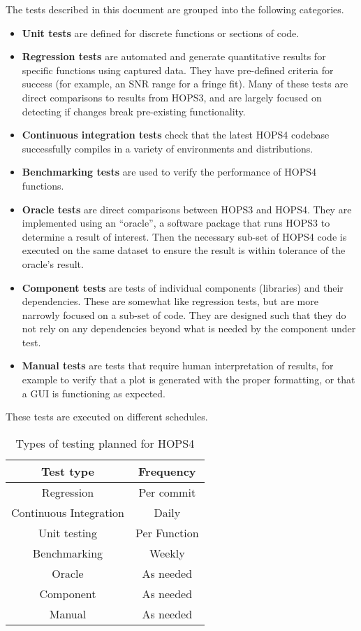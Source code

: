 \documentclass[notitlepage,letterpaper,pdftex,12pt,final]{article}
\numberwithin{equation}{section}
\begin{document}
The tests described in this document are grouped into the following categories.

\begin{itemize}
\item[] \textbf{Unit tests} are defined for discrete functions or sections of code.
\item[] \textbf{Regression tests} are automated and generate quantitative results for specific
  functions using captured data. They have pre-defined criteria for success (for example, an SNR range for a fringe fit). Many of these tests are direct comparisons to results from HOPS3,
  and are largely focused on detecting if changes break pre-existing functionality.
\item[] \textbf{Continuous integration tests} check that the latest HOPS4 codebase successfully compiles in a variety of environments and distributions.
\item[] \textbf{Benchmarking tests} are used to verify the performance of HOPS4 functions.
\item[] \textbf{Oracle tests} are direct comparisons between HOPS3 and HOPS4. They are implemented using an ``oracle'', a software package that runs HOPS3 to determine a result of interest. Then the necessary sub-set of HOPS4 code is executed on the same dataset to ensure the result is within tolerance of the oracle's result.
\item[] \textbf{Component tests} are tests of individual components (libraries) and their dependencies. These are somewhat like regression tests, but are more narrowly focused on a sub-set of code. They are designed such that they do not rely on any dependencies beyond what is needed by the component under test. 
\item[] \textbf{Manual tests} are tests that require human interpretation of results, for example to verify that a plot is generated with the proper formatting, or that a GUI is functioning as expected.

\end{itemize}

These tests are executed on different schedules.

\begin{table}[h!]
\centering
 \begin{tabular}{c | c} 
 Test type & Frequency \\ [0.5ex] 
 \hline%
 Regression &  Per commit \\ 
 Continuous Integration & Daily \\
 Unit testing & Per Function \\ 
 Benchmarking & Weekly \\
 Oracle  & As needed \\
 Component & As needed \\ 
 Manual & As needed \\ [1ex]
 \end{tabular}
 \caption{Types of testing planned for HOPS4}
 \label{table:2}
\end{table}
\end{document}
